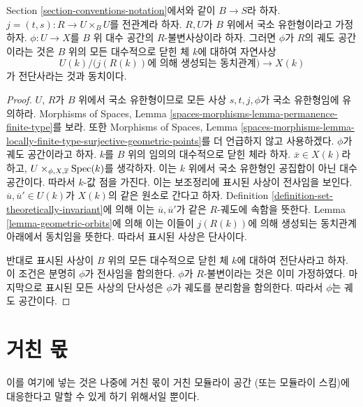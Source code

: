 \begin{lemma}
\label{lemma-orbit-space-locally-finite-type-over-base}
Section \ref{section-conventions-notation}에서와 같이 $B \to S$라 하자.
$j = (t, s) : R \to U \times_B U$를 전관계라 하자.
$R, U$가 $B$ 위에서 국소 유한형이라고 가정하자.
$\phi : U \to X$를 $B$ 위 대수 공간의 $R$-불변사상이라 하자.
그러면 $\phi$가 $R$의 궤도 공간이라는 것은 $B$ 위의 모든
대수적으로 닫힌 체 $k$에 대하여 자연사상
$$
U(k)/\big(j(R(k))\text{에 의해 생성되는 동치관계}\big)
\longrightarrow
X(k)
$$
가 전단사라는 것과 동치이다.
\end{lemma}

\begin{proof}
$U$, $R$가 $B$ 위에서 국소 유한형이므로 모든 사상
$s, t, j, \phi$가 국소 유한형임에 유의하라. Morphisms of Spaces,
Lemma \ref{spaces-morphisms-lemma-permanence-finite-type}를 보라.
또한 Morphisms of Spaces, Lemma
\ref{spaces-morphisms-lemma-locally-finite-type-surjective-geometric-points}를
더 언급하지 않고 사용하겠다. $\phi$가 궤도 공간이라고 하자.
$k$를 $B$ 위의 임의의 대수적으로 닫힌 체라 하자.
$\overline{x} \in X(k)$라 하고,
$U \times_{\phi, X, \overline{x}} \mathop{\mathrm{Spec}}(k)$를 생각하자.
이는 $k$ 위에서 국소 유한형인 공집합이 아닌 대수 공간이다.
따라서 $k$-값 점을 가진다. 이는 보조정리에 표시된 사상이
전사임을 보인다. $\overline{u}, \overline{u}' \in U(k)$가
$X(k)$의 같은 원소로 간다고 하자. Definition
\ref{definition-set-theoretically-invariant}에 의해 이는
$\overline{u}, \overline{u}'$가 같은 $R$-궤도에 속함을 뜻한다.
Lemma \ref{lemma-geometric-orbits}에 의해 이는 이들이
$j(R(k))$에 의해 생성되는 동치관계 아래에서 동치임을 뜻한다.
따라서 표시된 사상은 단사이다.

\medskip\noindent
반대로 표시된 사상이 $B$ 위의 모든 대수적으로 닫힌 체 $k$에
대하여 전단사라고 하자. 이 조건은 분명히 $\phi$가 전사임을
함의한다. $\phi$가 $R$-불변이라는 것은 이미 가정하였다.
마지막으로 표시된 모든 사상의 단사성은 $\phi$가 궤도를
분리함을 함의한다. 따라서 $\phi$는 궤도 공간이다.
\end{proof}

\section{거친 몫}
\label{section-coarse}

\noindent
이를 여기에 넣는 것은 나중에 거친 몫이 거친 모듈라이 공간
(또는 모듈라이 스킴)에 대응한다고 말할 수 있게 하기 위해서일 뿐이다.

